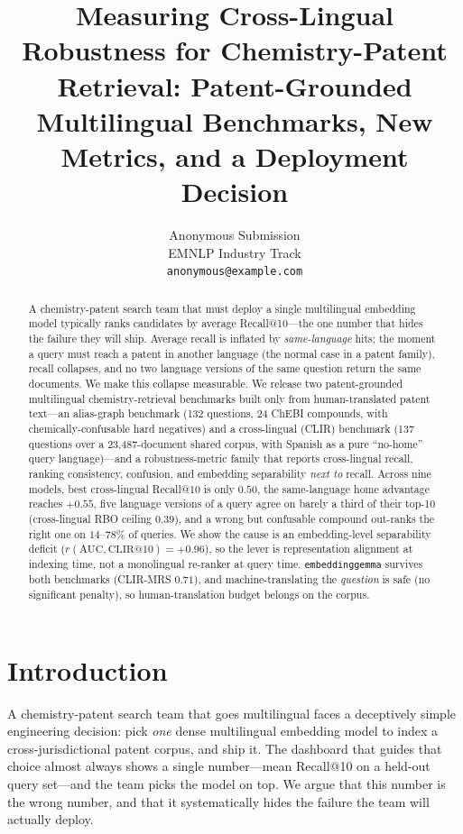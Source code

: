 \documentclass[11pt]{article}
\title{Measuring Cross-Lingual Robustness for Chemistry-Patent Retrieval:
Patent-Grounded Multilingual Benchmarks, New Metrics, and a Deployment Decision}
\author{Anonymous Submission \\
  EMNLP Industry Track \\
  \texttt{anonymous@example.com}}
\begin{document}
\maketitle

\begin{abstract}
A chemistry-patent search team that must deploy a single multilingual
embedding model typically ranks candidates by average Recall@10---the one
number that hides the failure they will ship. Average recall is inflated by
\emph{same-language} hits; the moment a query must reach a patent in another
language (the normal case in a patent family), recall collapses, and no two
language versions of the same question return the same documents. We make this
collapse measurable. We release two patent-grounded multilingual
chemistry-retrieval benchmarks built only from human-translated patent
text---an alias-graph benchmark (132 questions, 24 ChEBI compounds, with
chemically-confusable hard negatives) and a cross-lingual (CLIR) benchmark (137
questions over a 23{,}487-document shared corpus, with Spanish as a pure
``no-home'' query language)---and a robustness-metric family that reports
cross-lingual recall, ranking consistency, confusion, and embedding
separability \emph{next to} recall. Across nine models, best cross-lingual
Recall@10 is only $0.50$, the same-language home advantage reaches $+0.55$,
five language versions of a query agree on barely a third of their top-10
(cross-lingual RBO ceiling $0.39$), and a wrong but confusable compound
out-ranks the right one on $14$--$78\%$ of queries. We show the cause is an
embedding-level separability deficit ($r(\mathrm{AUC},\mathrm{CLIR@10})=+0.96$),
so the lever is representation alignment at indexing time, not a monolingual
re-ranker at query time. \texttt{embeddinggemma} survives both benchmarks
(CLIR-MRS $0.71$), and machine-translating the \emph{question} is safe
(no significant penalty), so human-translation budget belongs on the corpus.
\end{abstract}

\section{Introduction}

A chemistry-patent search team that goes multilingual faces a deceptively
simple engineering decision: pick \emph{one} dense multilingual embedding model
to index a cross-jurisdictional patent corpus, and ship it. The dashboard that
guides that choice almost always shows a single number---mean Recall@10 on a
held-out query set---and the team picks the model on top. We argue that this
number is the wrong number, and that it systematically hides the failure the
team will actually deploy.
\end{document}
